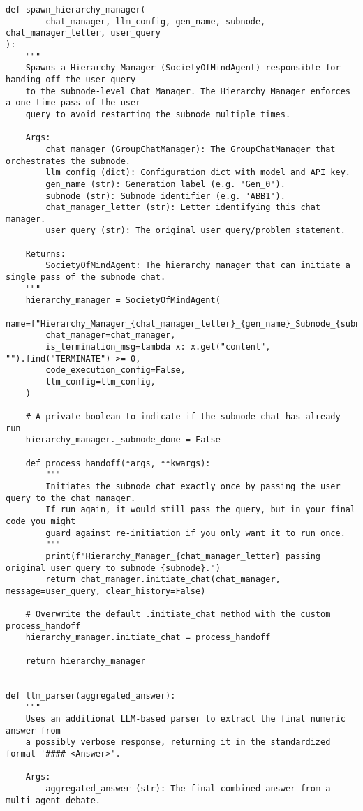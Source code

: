 \begin{lstlisting}
def spawn_hierarchy_manager(
        chat_manager, llm_config, gen_name, subnode, chat_manager_letter, user_query
):
    """
    Spawns a Hierarchy Manager (SocietyOfMindAgent) responsible for handing off the user query
    to the subnode-level Chat Manager. The Hierarchy Manager enforces a one-time pass of the user
    query to avoid restarting the subnode multiple times.

    Args:
        chat_manager (GroupChatManager): The GroupChatManager that orchestrates the subnode.
        llm_config (dict): Configuration dict with model and API key.
        gen_name (str): Generation label (e.g. 'Gen_0').
        subnode (str): Subnode identifier (e.g. 'ABB1').
        chat_manager_letter (str): Letter identifying this chat manager.
        user_query (str): The original user query/problem statement.

    Returns:
        SocietyOfMindAgent: The hierarchy manager that can initiate a single pass of the subnode chat.
    """
    hierarchy_manager = SocietyOfMindAgent(
        name=f"Hierarchy_Manager_{chat_manager_letter}_{gen_name}_Subnode_{subnode}",
        chat_manager=chat_manager,
        is_termination_msg=lambda x: x.get("content", "").find("TERMINATE") >= 0,
        code_execution_config=False,
        llm_config=llm_config,
    )

    # A private boolean to indicate if the subnode chat has already run
    hierarchy_manager._subnode_done = False

    def process_handoff(*args, **kwargs):
        """
        Initiates the subnode chat exactly once by passing the user query to the chat manager.
        If run again, it would still pass the query, but in your final code you might
        guard against re-initiation if you only want it to run once.
        """
        print(f"Hierarchy_Manager_{chat_manager_letter} passing original user query to subnode {subnode}.")
        return chat_manager.initiate_chat(chat_manager, message=user_query, clear_history=False)

    # Overwrite the default .initiate_chat method with the custom process_handoff
    hierarchy_manager.initiate_chat = process_handoff

    return hierarchy_manager


def llm_parser(aggregated_answer):
    """
    Uses an additional LLM-based parser to extract the final numeric answer from
    a possibly verbose response, returning it in the standardized format '#### <Answer>'.

    Args:
        aggregated_answer (str): The final combined answer from a multi-agent debate.


\end{lstlisting}
